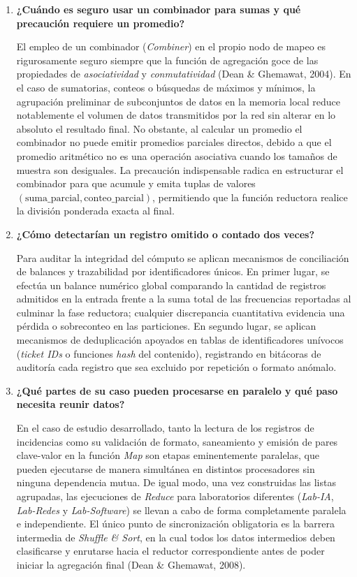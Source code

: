\documentclass[12pt,a4paper]{article}
\begin{document}
\begin{enumerate}
    \item \textbf{¿Cuándo es seguro usar un combinador para sumas y qué precaución requiere un promedio?}
    
    El empleo de un combinador (\textit{Combiner}) en el propio nodo de mapeo es rigurosamente seguro siempre que la función de agregación goce de las propiedades de \textit{asociatividad} y \textit{conmutatividad} (Dean \& Ghemawat, 2004). En el caso de sumatorias, conteos o búsquedas de máximos y mínimos, la agrupación preliminar de subconjuntos de datos en la memoria local reduce notablemente el volumen de datos transmitidos por la red sin alterar en lo absoluto el resultado final. No obstante, al calcular un promedio el combinador no puede emitir promedios parciales directos, debido a que el promedio aritmético no es una operación asociativa cuando los tamaños de muestra son desiguales. La precaución indispensable radica en estructurar el combinador para que acumule y emita tuplas de valores $(\text{suma\_parcial}, \text{conteo\_parcial})$, permitiendo que la función reductora realice la división ponderada exacta al final.

    \item \textbf{¿Cómo detectarían un registro omitido o contado dos veces?}
    
    Para auditar la integridad del cómputo se aplican mecanismos de conciliación de balances y trazabilidad por identificadores únicos. En primer lugar, se efectúa un balance numérico global comparando la cantidad de registros admitidos en la entrada frente a la suma total de las frecuencias reportadas al culminar la fase reductora; cualquier discrepancia cuantitativa evidencia una pérdida o sobreconteo en las particiones. En segundo lugar, se aplican mecanismos de deduplicación apoyados en tablas de identificadores unívocos (\textit{ticket IDs} o funciones \textit{hash} del contenido), registrando en bitácoras de auditoría cada registro que sea excluido por repetición o formato anómalo.

    \item \textbf{¿Qué partes de su caso pueden procesarse en paralelo y qué paso necesita reunir datos?}
    
    En el caso de estudio desarrollado, tanto la lectura de los registros de incidencias como su validación de formato, saneamiento y emisión de pares clave-valor en la función \textit{Map} son etapas eminentemente paralelas, que pueden ejecutarse de manera simultánea en distintos procesadores sin ninguna dependencia mutua. De igual modo, una vez construidas las listas agrupadas, las ejecuciones de \textit{Reduce} para laboratorios diferentes (\textit{Lab-IA}, \textit{Lab-Redes} y \textit{Lab-Software}) se llevan a cabo de forma completamente paralela e independiente. El único punto de sincronización obligatoria es la barrera intermedia de \textit{Shuffle \& Sort}, en la cual todos los datos intermedios deben clasificarse y enrutarse hacia el reductor correspondiente antes de poder iniciar la agregación final (Dean \& Ghemawat, 2008).


\end{enumerate}
\end{document}
